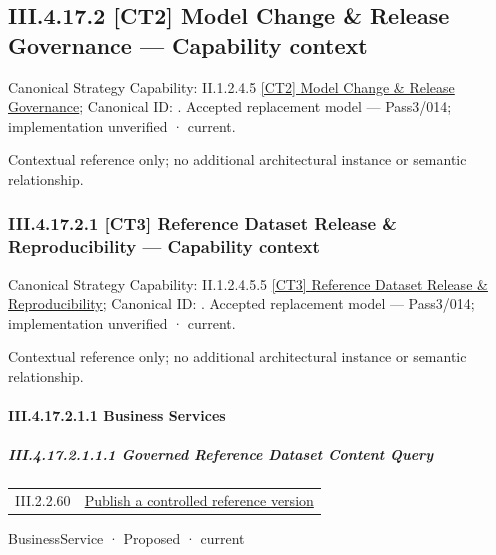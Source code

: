 \subsection*{III.4.17.2 [CT2] Model Change \& Release Governance — Capability context}
\label{navigation:III.4.17.2}

{\small Canonical Strategy Capability: II.1.2.4.5 \hyperref[element:2eb455d8b4284a1fb175a0f1fa462cdf]{[CT2] Model Change \& Release Governance}; Canonical ID: \texttt{}. Accepted replacement model — Pass3/014; implementation unverified · current.}\par
Contextual reference only; no additional architectural instance or semantic relationship.\par
\subsubsection*{III.4.17.2.1 [CT3] Reference Dataset Release \& Reproducibility — Capability context}
\label{navigation:III.4.17.2.1}

{\small Canonical Strategy Capability: II.1.2.4.5.5 \hyperref[element:b01212ce058843b2bfee85a6d3062525]{[CT3] Reference Dataset Release \& Reproducibility}; Canonical ID: \texttt{}. Accepted replacement model — Pass3/014; implementation unverified · current.}\par
Contextual reference only; no additional architectural instance or semantic relationship.\par
\paragraph*{III.4.17.2.1.1 Business Services}
\label{navigation:III.4.17.2.1.1}

\subparagraph*{III.4.17.2.1.1.1 Governed Reference Dataset Content Query}
\label{navigation:III.4.17.2.1.1.1}

\begin{longtable}{p{.22\linewidth}p{.73\linewidth}}
III.2.2.60 & \hyperref[element:156eb857d5c14baaae1c1cc59fe3490b]{Publish a controlled reference version} \\
\end{longtable}
\label{element:625ef1036a7442b2b8aed06f72b8afff}
{\small BusinessService · Proposed · current}\par

